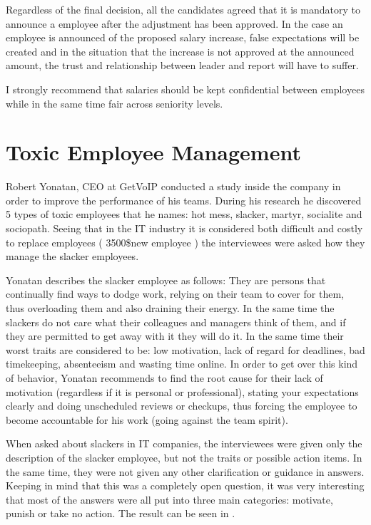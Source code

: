 Regardless of the final decision, all the candidates agreed that it is mandatory to announce a employee after the adjustment has been approved. In the case an employee is announced of the proposed salary increase, false expectations will be created and in the situation that the increase is not approved at the announced amount, the trust and relationship between leader and report will have to suffer. 

I strongly recommend that salaries should be kept confidential between employees while in the same time fair across seniority levels.

\section{Toxic Employee Management}
\label{sec:toxic}
Robert Yonatan, CEO at GetVoIP conducted a study inside the company in order to improve the performance of his teams. During his research \cite{toxic} he discovered 5 types of toxic employees that he names: hot mess, slacker, martyr, socialite and sociopath. Seeing that in the IT industry it is considered both difficult and costly to replace employees ( 3500\$new employee \cite{cost-replace}) the interviewees were asked how they manage the slacker employees.

Yonatan describes the slacker employee as follows: They are persons that continually find ways to dodge work, relying on their team to cover for them, thus overloading them and also draining their energy. In the same time the slackers do not care what their colleagues and managers think of them, and if they are permitted to get away with it they will do it. In the same time their worst traits are considered to be: low motivation, lack of regard for deadlines, bad timekeeping, absenteeism and wasting time online. In order to get over this kind of behavior, Yonatan recommends to find the root cause for their lack of motivation (regardless if it is personal or professional), stating your expectations clearly and doing unscheduled reviews or checkups, thus forcing the employee to become accountable for his work (going against the team spirit).

When asked about slackers in IT companies, the interviewees were given only the description of the slacker employee, but not the traits or possible action items. In the same time, they were not given any other clarification or guidance in answers. Keeping in mind that this was a completely open question, it was very interesting that most of the answers were all put into three main categories: motivate, punish or take no action. The result can be seen in .

